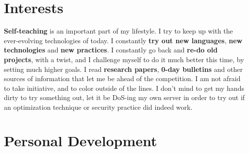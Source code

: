 \documentclass[11pt,a4paper,sans]{moderncv}
\begin{document}
\section{Interests}
	\textbf{Self-teaching} is an important part of my lifestyle. I try to keep up with the ever-evolving technologies of today. I constantly \textbf{try out new languages}, \textbf{new technologies} and \textbf{new practices}. I constantly go back and \textbf{re-do old projects}, with a twist, and I challenge myself to do it much better this time, by setting much higher goals. I read \textbf{research papers}, \textbf{0-day bulletins} and other sources of information that let me be ahead of the competition. I am not afraid to take initiative, and to color outside of the lines. I don't mind to get my hands dirty to try something out, let it be DoS-ing my own server in order to try out if an optimization technique or security practice did indeed work.

\section{Personal Development}
\end{document}
